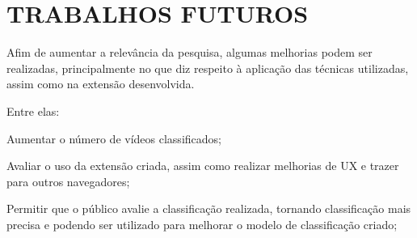 \section{TRABALHOS FUTUROS}

Afim de aumentar a relevância da pesquisa, algumas melhorias podem ser realizadas, principalmente no que diz respeito à aplicação das técnicas utilizadas, assim como na extensão desenvolvida.

Entre elas:

\begin{alineas}
    
    \item Aumentar o número de vídeos classificados;
    \item Avaliar o uso da extensão criada, assim como realizar melhorias de UX e trazer para outros navegadores;
    \item Permitir que o público avalie a classificação realizada, tornando classificação mais precisa e podendo ser utilizado para melhorar o modelo de classificação criado;
    
\end{alineas}

